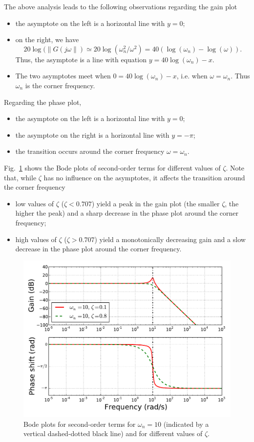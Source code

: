 \documentclass[a4paper,11pt]{report}
\theoremstyle{definition}
\begin{document}
The above analysis leads to the following observations regarding the
gain plot
\begin{itemize}
\item the asymptote on the left is a horizontal line with $y=0$;
\item on the right, we have 
  \[
  20\log(\|G(j\omega\|)\simeq20\log(\omega_n^2/\omega^2)=40(\log(\omega_n)-\log(\omega)).
  \]
  Thus, the asymptote is a line with equation $y=40\log(\omega_n)-x$.
\item The two asymptotes meet when $0=40\log(\omega_n)-x$, i.e. when
  $\omega=\omega_n$. Thus $\omega_n$ is the corner frequency.
\end{itemize}

Regarding the phase plot, 
\begin{itemize}
\item the asymptote on the left is a horizontal line with $y=0$;
\item the asymptote on the right is a horizontal line with $y=-\pi$;
\item the transition occurs around the corner frequency $\omega=\omega_n$.
\end{itemize}


Fig.~\ref{fig:bode-2nd} shows the Bode plots of second-order terms for
different values of $\zeta$. Note that, while $\zeta$ has no influence
on the asymptotes, it affects the transition around the corner
frequency
\begin{itemize}
\item low values of $\zeta$ ($\zeta<0.707$) yield a peak in the gain
  plot (the smaller $\zeta$, the higher the peak) and a sharp decrease
  in the phase plot around the corner frequency;
\item high values of $\zeta$ ($\zeta>0.707$) yield a monotonically
  decreasing gain and a slow decrease in the phase plot around the
  corner frequency.
\end{itemize}

\begin{figure}[H]
  \centering
  \includegraphics[width=12cm]{fig/bode-second.pdf}
  \caption{Bode plots for second-order terms for $\omega_n=10$
    (indicated by a vertical dashed-dotted black line) and for
    different values of $\zeta$.}
  \label{fig:bode-2nd}
\end{figure}
\end{document}
